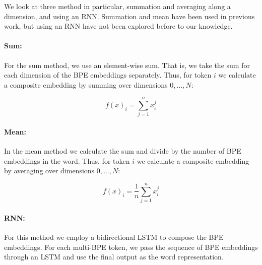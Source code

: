 \documentclass[11pt]{article}
\newcommand\jp[1]{(\textbf{JP:} #1)}
\begin{document}
	


        We look at three method in particular, summation and averaging
     along a dimension, and using an RNN. Summation and mean have been
     used in previous work, but using an RNN have not been explored
     before to our knowledge.
    
    	\paragraph{Sum:} For the sum method, we use an element-wise
     sum. That is, we take the sum for each dimension of the BPE
     embeddings separately. Thus, for token $i$ we calculate a
     composite embedding by summing over dimensions $0,\ldots,N$:
	
	\begin{equation}
	f(x)_i = \sum_{j=1}^{n} x_i^j
	\end{equation}
	

    	\paragraph{Mean:} In the mean method we calculate the sum and
     divide by the number of BPE embeddings in the word. Thus, for
     token $i$ we calculate a composite embedding by averaging over
     dimensions $0,\ldots,N$:
	
	\begin{equation}
	f(x)_{i} = \frac{1}{n}\sum_{j=1}^{n} x_i^j
	\end{equation}
	
	
	\paragraph{RNN:} For this method we employ a bidirectional LSTM
        to compose the BPE embeddings. For each multi-BPE
        token, we pass the sequence of BPE embeddings through an LSTM
        and use the final output as the word representation. 
    
\end{document}
